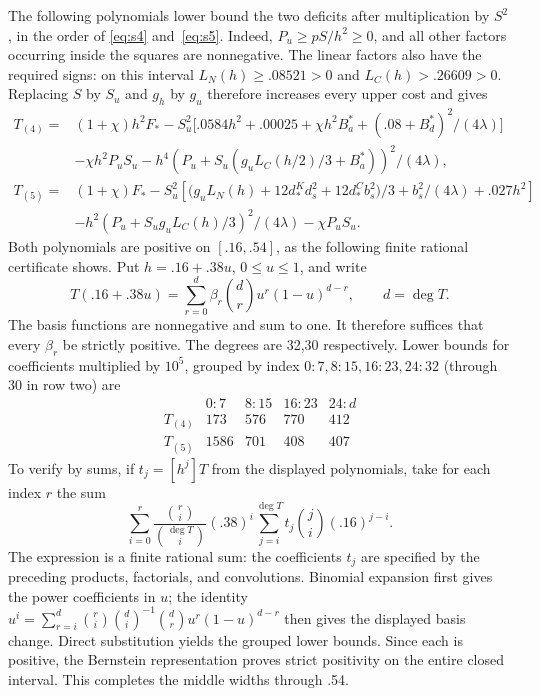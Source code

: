 The following polynomials lower bound the two deficits after multiplication by $S^2$, in the order of \eqref{eq:s4} and~\eqref{eq:s5}. Indeed, $P_u\ge pS/h^2\ge0$, and all other factors occurring inside the squares are nonnegative. The linear factors also have the required signs: on this interval $L_N(h)\ge.08521>0$ and $L_C(h)>.26609>0$. Replacing $S$ by $S_u$ and $g_h$ by $g_u$ therefore increases every upper cost and gives
\[
\begin{aligned}
 T_{(4)}={}&(1+\chi)h^2F_*- S_u^2\big[.0584h^2+.00025+\chi h^2 B_a^*+(.08+B_d^*)^2/(4\lambda)\big]\\
          &-\chi h^2 P_u S_u-h^4(P_u+S_u(g_u L_C(h/2)/3+B_a^*))^2/(4\lambda),\\
 T_{(5)}={}&(1+\chi)F_*-
  S_u^2\left[\big(g_u L_N(h)+12d_*^K d_s^2+12d_*^C b_s^2\big)/3+b_s^2/(4\lambda)+.027h^2\right]\\
          &-h^2(P_u+S_u g_u L_C(h)/3)^2/(4\lambda)-\chi P_u S_u .
\end{aligned}
\]
Both polynomials are positive on $[.16,.54]$, as the following finite rational certificate shows. Put $h=.16+.38u$, $0\le u\le1$, and write
\[
 T(.16+.38u)=\sum_{r=0}^{d}\beta_r\binom dr u^r(1-u)^{d-r},
 \qquad d=\deg T.
\]
The basis functions are nonnegative and sum to one. It therefore suffices that every $\beta_r$ be strictly positive. The degrees are 32,30 respectively. Lower bounds for coefficients multiplied by $10^5$, grouped by index $0{:}7,8{:}15,16{:}23,24{:}32$ (through 30 in row two) are
\[
\begin{array}{c|rrrr}
 &0{:}7&8{:}15&16{:}23&24{:}d\\\hline
 T_{(4)}&173&576&770&412\\
T_{(5)}&1586&701&408&407
\end{array}
\]
To verify by sums, if $t_j=[h^j]T$ from the displayed polynomials, take for each index $r$ the sum
\[
 \sum_{i=0}^r\frac{\binom ri}{\binom{\deg T}i}(.38)^i
       \sum_{j=i}^{\deg T}t_j\binom ji(.16)^{j-i}.
\]
The expression is a finite rational sum: the coefficients $t_j$ are specified by the preceding products, factorials, and convolutions. Binomial expansion first gives the power coefficients in $u$; the identity $u^i=\sum_{r=i}^d\binom ri\binom di^{-1}\binom dr u^r(1-u)^{d-r}$ then gives the displayed basis change. Direct substitution yields the grouped lower bounds. Since each is positive, the Bernstein representation proves strict positivity on the entire closed interval. This completes the middle widths through .54.

